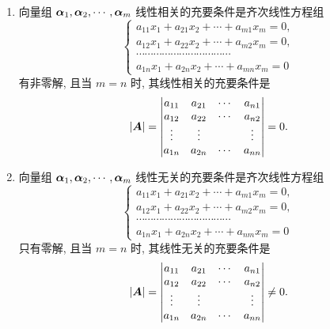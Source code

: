 \begin{enumerate}[label=(\arabic{*})]
    \item 向量组 $ \vb*{\alpha}_{1}, \vb*{\alpha}_{2}, \cdots, \vb*{\alpha}_{m} $ 线性相关的充要条件是齐次线性方程组
          $$\left\{\begin{array}{l}
                  a_{11} x_{1}+a_{21} x_{2}+\cdots+a_{m 1} x_{m}=0,                            \\
                  a_{12} x_{1}+a_{22} x_{2}+\cdots+a_{m 2} x_{m}=0,                            \\
                  \cdots \cdots \cdots \cdots \cdots \cdots \cdots \cdots \cdots \cdots \cdots \\
                  a_{1 n} x_{1}+a_{2 n} x_{2}+\cdots+a_{m n} x_{m}=0
              \end{array}\right.$$
          有非零解, 且当 $ m=n $ 时, 其线性相关的充要条件是
          $$|\vb*{A}|=\begin{vmatrix}a_{11}  & a_{21}  & \cdots & a_{n 1} \\
               a_{12}  & a_{22}  & \cdots & a_{n 2} \\
               \vdots  & \vdots  &        & \vdots  \\
               a_{1 n} & a_{2 n} & \cdots & a_{n n}\end{vmatrix}=0 .$$
    \item 向量组 $ \vb*{\alpha}_{1}, \vb*{\alpha}_{2}, \cdots, \vb*{\alpha}_{m} $ 线性无关的充要条件是齐次线性方程组
          $$\left\{\begin{array}{l}
                  a_{11} x_{1}+a_{21} x_{2}+\cdots+a_{m 1} x_{m}=0,                            \\
                  a_{12} x_{1}+a_{22} x_{2}+\cdots+a_{m 2} x_{m}=0,                            \\
                  \cdots \cdots \cdots \cdots \cdots \cdots \cdots \cdots \cdots \cdots \cdots \\
                  a_{1 n} x_{1}+a_{2 n} x_{2}+\cdots+a_{n m} x_{m}=0
              \end{array}\right.$$
          只有零解, 且当 $ m=n $ 时, 其线性无关的充要条件是
          $$|\vb*{A}|=\begin{vmatrix}a_{11}  & a_{21}  & \cdots & a_{n 1} \\
               a_{12}  & a_{22}  & \cdots & a_{n 2} \\
               \vdots  & \vdots  &        & \vdots  \\
               a_{1 n} & a_{2 n} & \cdots & a_{n n}\end{vmatrix}\neq 0 .$$

\end{enumerate}
